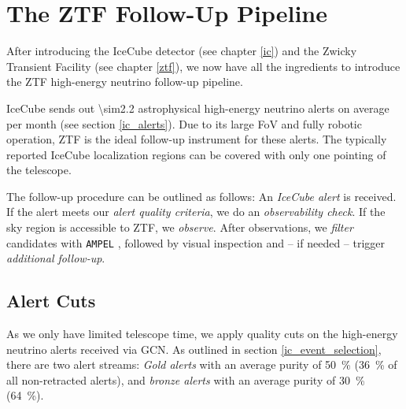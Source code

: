 \documentclass[
    a4paper, %
    fontsize=10pt, %
    twoside=true, %
    numbers=noenddot, %
    fontmethod=tex,
]{kaobook}
\begin{document}

\tableofcontents
\listoffigures

\let\cleardoublepage\bigskip
\let\clearpage\bigskip

\listoftables

\endgroup

\mainmatter
{}






\chapter{The ZTF Follow-Up Pipeline} 
After introducing the IceCube detector (see chapter \ref{ic}) and the Zwicky Transient Facility (see chapter \ref{ztf}), we now have all the ingredients to introduce the ZTF high-energy neutrino follow-up pipeline.

IceCube sends out \num{\sim2.2} astrophysical high-energy neutrino alerts on average per month (see section \ref{ic_alerts}). Due to its large FoV and fully robotic operation, ZTF is the ideal follow-up instrument for these alerts. The typically reported IceCube localization regions can be covered with only one pointing of the telescope.

The follow-up procedure can be outlined as follows: An \textit{IceCube alert} is received. If the alert meets our \textit{alert quality criteria}, we do an \textit{observability check}. If the sky region is accessible to ZTF, we \textit{observe}. After observations, we \textit{filter} candidates with \texttt{AMPEL} , followed by visual inspection and -- if needed -- trigger \textit{additional follow-up}.

\section{Alert Cuts}\label{alert_cuts}
As we only have limited telescope time, we apply quality cuts on the high-energy neutrino alerts received via GCN. As outlined in section \ref{ic_event_selection}, there are two alert streams: \textit{Gold alerts} with an average purity of \SI{50}{\percent} (\SI{36}{\percent} of all non-retracted alerts), and \textit{bronze alerts} with an average purity of \SI{30}{\percent} (\SI{64}{\percent}).
\end{document}
